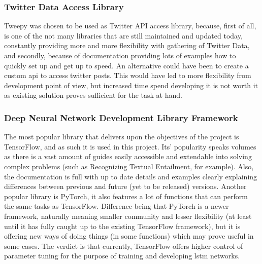         \subsubsection{Twitter Data Access Library}
            Tweepy was chosen to be used as Twitter API access library, because, first of all, is one of the not many libraries that are still maintained and updated today, constantly providing more and more flexibility with gathering of Twitter Data, and secondly, because of documentation providing lots of examples how to quickly set up and get up to speed. An alternative could have been to create a custom \gls{api} to access twitter posts. This would have led to more flexibility from development point of view, but increased time spend developing it is not worth it as existing solution proves sufficient for the task at hand.
            
        \subsubsection{Deep Neural Network Development Library Framework}
            The most popular library that delivers upon the objectives of the project is TensorFlow, and as such it is used in this project. Its' popularity speaks volumes as there is a vast amount of guides easily accessible and extendable into solving complex problems (such as Recognizing Textual Entailment, for example). Also, the documentation is full with up to date details and examples clearly explaining differences between previous and future (yet to be released) versions. Another popular library is PyTorch, it also features a lot of functions that can perform the same tasks as TensorFlow. Difference being that PyTorch is a newer framework, naturally meaning smaller community and lesser flexibility (at least until it has fully caught up to the existing TensorFlow framework), but it is offering new ways of doing things (in some functions) which may prove useful in some cases. The verdict is that currently, TensorFlow offers higher control of parameter tuning for the purpose of training and developing \gls{lstm} networks.
            
